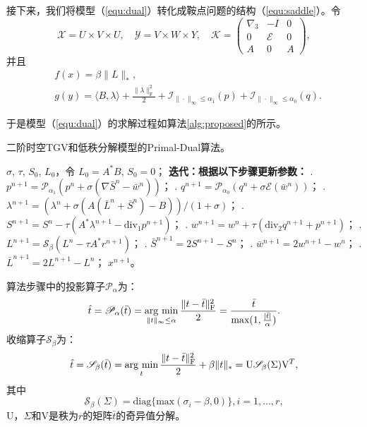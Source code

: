 接下来，我们将模型（\ref{equ:dual}）转化成鞍点问题的结构（\ref{equ:saddle}）。令$$\mathcal{X}=U\times V\times U,\quad \mathcal{Y}=V\times W\times Y, \quad
	\mathcal{K}=
\begin{pmatrix}
\nabla_3 & -I & 0\\
0 & \mathcal{E} & 0\\
A & 0 & A
\end{pmatrix},
$$
并且
\begin{equation*}
\begin{aligned}
&f(x)=\beta\|L\|_*,\\
&g(y)=\langle B,\lambda\rangle+\frac{\|\lambda\|_\mathrm{F}^2}{2}+\mathcal{I}_{\|\cdot\|_\infty\leq\alpha_1}(p)+\mathcal{I}_{\|\cdot\|_\infty\leq\alpha_0}(q).
\end{aligned}
\end{equation*}

于是模型（\ref{equ:dual}）的求解过程如算法\ref{alg:proposed}的所示。

\begin{algorithm}
	\caption{二阶时空TGV和低秩分解模型的Primal-Dual算法。}
	\label{alg:proposed}
	\begin{algorithmic}
		\REQUIRE $\sigma$, $\tau$, $S_0$, $L_0$，令 $L_0=A^*B$, $S_0=0$；
		\INDSTATE[-1.25] \textbf{迭代：根据以下步骤更新参数：}	
		. $p^{n+1} = \mathscr{P}_{\alpha_1}(p^n+\sigma(\nabla \bar{S}^n-\bar{w}^n))$；
		. $q^{n+1} = \mathscr{P}_{\alpha_0}(q^n+\sigma\mathcal{E}(\bar{w}^n))$；
		. $\lambda^{n+1} = (\lambda^{n}+\sigma(A(\bar{L}^n+\bar{S}^n)-B))/(1+\sigma)$；
		. $S^{n+1} = S^n-\tau(A^*\lambda^{n+1}-\mathrm{div}_1 p^{n+1})$；
		. $w^{n+1} = w^n+\tau(\mathrm{div}_2q^{n+1}+p^{n+1})$；
		. $L^{n+1} = \mathscr{S}_\beta(L^n-\tau A^*r^{n+1})$；
		. $\bar{S}^{n+1} = 2S^{n+1}-S^n$；
		. $\bar{w}^{n+1} = 2w^{n+1}-w^n$；
		. $\bar{L}^{n+1} = 2L^{n+1}-L^n$；
		\ENSURE $x^{n+1}$。
	\end{algorithmic}
\end{algorithm}

算法步骤中的投影算子$\mathscr{P}_\alpha$为：
$$\hat{t}=\mathscr{P}_\alpha(\bar{t})=\argmin_{\|t\|_\infty\leq \alpha}\frac{\|t-\bar{t}\|^2_\mathrm{F}}{2}=\frac{\bar{t}}{\text{max}(1,\frac{|\bar{t}|}{\alpha})}.$$
收缩算子$\mathscr{S}_\beta$为：
$$\hat{t}=\mathscr{S}_\beta(\bar{t})=\argmin_{t}\frac{\|t-\bar{t}\|_\mathrm{F}^2}{2}+\beta\|t\|_*=\mathrm{U}\mathscr{S}_\beta(\Sigma)\mathrm{V}^T,$$
其中
$$\mathscr{S}_\beta(\Sigma)=\mathrm{diag}\{\text{max}(\sigma_i-\beta,0)\}, i=1,...,r,$$
$\mathrm{U}$，$\Sigma$和$\mathrm{V}$是秩为$r$的矩阵$\bar{t}$的奇异值分解。


